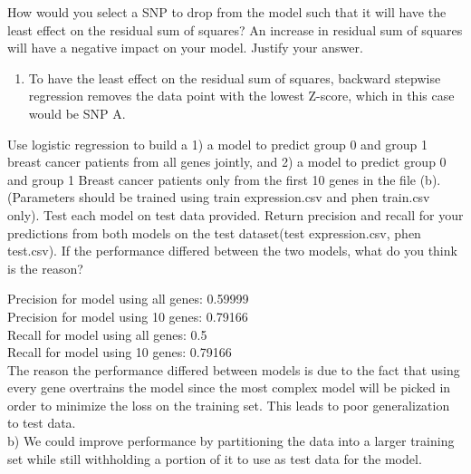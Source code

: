 \documentclass[12pt]{article}
\newenvironment{problem}[2][Problem]{\begin{trivlist}
\item[\hskip \labelsep {\bfseries #1}\hskip \labelsep {\bfseries #2.}]}{\end{trivlist}}
\begin{document}
\newpage

\begin{problem}{4}
How would you select a SNP to drop from the model such that it will have the least effect on the residual sum of squares? An increase in residual sum of squares will have a negative impact on your model. Justify your answer.
\end{problem}
\begin{enumerate}
\item To have the least effect on the residual sum of squares, backward stepwise regression removes the data point with the lowest Z-score, which in this case would be SNP A.
\end{enumerate}

\newpage
\begin{problem}{5}
Use logistic regression to build a 1) a model to predict group 0 and group 1 breast cancer patients from all genes jointly, and 2) a model to predict group 0 and group 1 Breast cancer patients only from the first 10 genes in the file (b). (Parameters should be trained using train expression.csv and phen train.csv only). Test each model on test
data provided. Return precision and recall for your predictions from both models on the test dataset(test expression.csv, phen test.csv). If the performance differed between the two models, what do you think is the reason?
\end{problem}

Precision for model using all genes: 0.59999 \\
Precision for model using 10 genes: 0.79166 \\
Recall for model using all genes: 0.5 \\
Recall for model using 10 genes: 0.79166 \\
The reason the performance differed between models is due to the fact that using every gene overtrains the model since the most complex model will be picked in order to minimize the loss on the training set. This leads to poor generalization to test data. \\

b) We could improve performance by partitioning the data into a larger training set while still withholding a portion of it to use as test data for the model.
\end{document}
